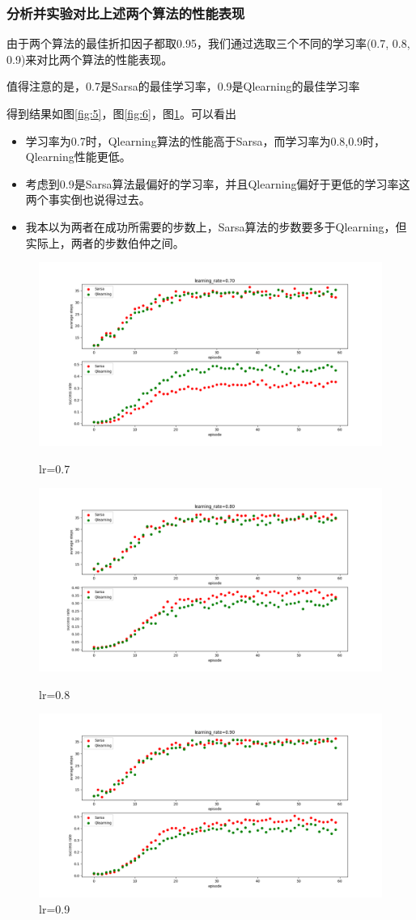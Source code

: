 \documentclass{article}
\begin{document}
\subsubsection*{分析并实验对比上述两个算法的性能表现}
由于两个算法的最佳折扣因子都取0.95，我们通过选取三个不同的学习率(0.7, 0.8, 0.9)来对比两个算法的性能表现。

值得注意的是，0.7是Sarsa的最佳学习率，0.9是Qlearning的最佳学习率

得到结果如图\ref{fig:5}，图\ref{fig:6}，图\ref{fig:7}。可以看出

\begin{itemize}
\item 学习率为0.7时，Qlearning算法的性能高于Sarsa，而学习率为0.8,0.9时，Qlearning性能更低。
\item 考虑到0.9是Sarsa算法最偏好的学习率，并且Qlearning偏好于更低的学习率这两个事实倒也说得过去。
\item 我本以为两者在成功所需要的步数上，Sarsa算法的步数要多于Qlearning，但实际上，两者的步数伯仲之间。
\end{itemize}

\begin{figure}[htbp]
	\centering
	\includegraphics[scale=0.4]{Img/lr=0.7.png}
	\caption{lr=0.7}\label{fig:5}
	\includegraphics[scale=0.4]{Img/lr=0.8.png}
	\caption{lr=0.8}\label{fig:6}
	\includegraphics[scale=0.4]{Img/lr=0.9.png}
	\caption{lr=0.9}\label{fig:7}
\end{figure}
\end{document}

